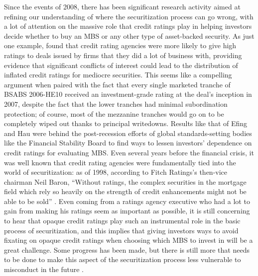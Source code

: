 \documentclass[12pt]{article}
\begin{document}
Since the events of 2008, there has been significant research activity aimed at refining our understanding of where the securitization process can go wrong, with a lot of attention on the massive role that credit ratings play in helping investors decide whether to buy an MBS or any other type of asset-backed security. As just one example, \textcite{efing14} found that credit rating agencies were more likely to give high ratings to deals issued by firms that they did a lot of business with, providing evidence that significant conflicts of interest could lead to the distribution of inflated credit ratings for mediocre securities. This seems like a compelling argument when paired with the fact that every single marketed tranche of BSABS 2006-HE10 received an investment-grade rating at the deal’s inception in 2007, despite the fact that the lower tranches had minimal subordination protection; of course, most of the mezzanine tranches would go on to be completely wiped out thanks to principal writedowns. Results like that of Efing and Hau were behind the post-recession efforts of global standards-setting bodies like the Financial Stability Board to find ways to lessen investors’ dependence on credit ratings for evaluating MBS. Even several years before the financial crisis, it was well known that credit rating agencies were fundamentally tied into the world of securitization: as of 1998, according to Fitch Ratings’s then-vice chairman Neil Baron, “Without ratings, the complex securities in the mortgage field which rely so heavily on the strength of credit enhancements might not be able to be sold” \parencite{baron98}. Even coming from a ratings agency executive who had a lot to gain from making his ratings seem as important as possible, it is still concerning to hear that opaque credit ratings play such an instrumental role in the basic process of securitization, and this implies that giving investors ways to avoid fixating on opaque credit ratings when choosing which MBS to invest in will be a great challenge. Some progress has been made, but there is still more that needs to be done to make this aspect of the securitization process less vulnerable to misconduct in the future \parencite{scheicher17}.
\end{document}
